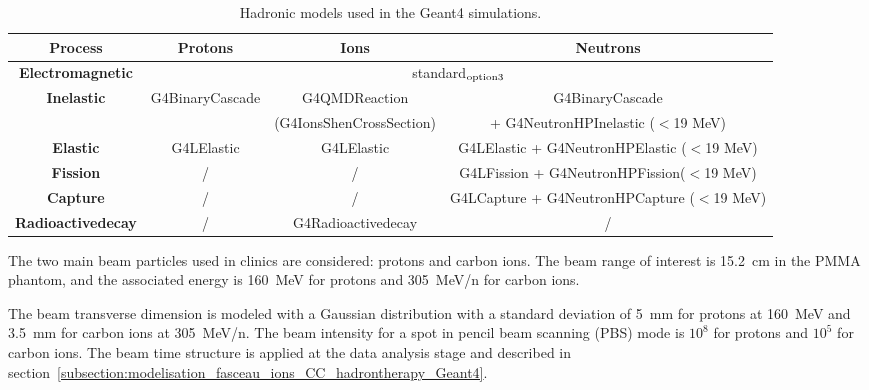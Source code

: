 
\begin{table}
\label{physlist_ion}
\caption{Hadronic models used in the Geant4 simulations.}
\begin{scriptsize}
\begin{center}
\renewcommand{\arraystretch}{1.2}
\begin{tabular} {cccc}\hline
\textbf{Process} & \textbf{Protons} & \textbf{Ions} & \textbf{Neutrons} \\ \hline 
\textbf{Electromagnetic} & \multicolumn{3}{c}{standard$_{\rm{option3}}$} \\ %
\textbf{Inelastic} & G4BinaryCascade & G4QMDReaction  &  G4BinaryCascade  \\ 
 & & (G4IonsShenCrossSection)&+ G4NeutronHPInelastic ($<$19 MeV)\\ %
\textbf{Elastic} & G4LElastic & G4LElastic & G4LElastic + G4NeutronHPElastic ($<$19 MeV)\\ %
\textbf{Fission} & / & / & G4LFission + G4NeutronHPFission($<$19 MeV) \\ %
\textbf{Capture} & / & / & G4LCapture +  G4NeutronHPCapture ($<$19 MeV) \\ %
\textbf{Radioactivedecay} & / & G4Radioactivedecay & / \\ \hline
\end{tabular}
\end{center}
\end{scriptsize}
\label{table:table_modele_physic_CC_simulation_Hadronth}
\end{table}

The two main beam particles used in clinics are considered: protons and carbon ions. The beam range of interest is 15.2~cm in the PMMA phantom, and the associated energy is 160~MeV for protons and 305~MeV/n for carbon ions.
 
The beam transverse dimension is modeled with a Gaussian distribution with a standard deviation of 5~mm for protons at 160~MeV and 3.5~mm for carbon ions at 305~MeV/n. The beam intensity for a spot in pencil beam scanning (PBS) mode is $10^8$ for protons and $10^5$ for carbon ions. The beam time structure is applied at the data analysis stage and described in section~\ref{subsection:modelisation_fasceau_ions_CC_hadrontherapy_Geant4}.


